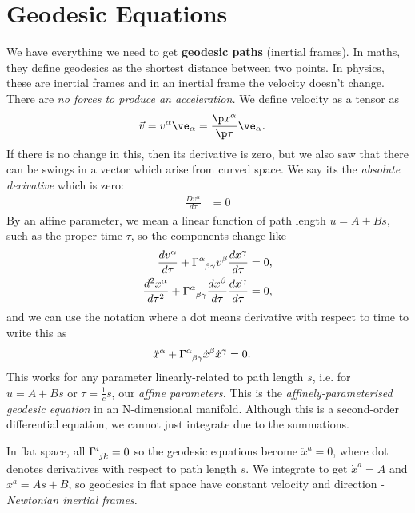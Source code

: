 \documentclass[a4paper, 11pt, normalem]{report}
\begin{document}
\section{Geodesic Equations}
We have everything we need to get \textbf{geodesic paths} (inertial frames).
In maths, they define geodesics as the shortest distance between two points. 
In physics, these are inertial frames and in an inertial frame the velocity doesn't change. 
There are \emph{no forces to produce an acceleration.}
We define velocity as a tensor as
\begin{align}
    \vec{v} &= v^\alpha\ve_{\alpha} = \frac{\p x^\alpha}{\p\tau}\ve_\alpha.
\end{align}
If there is no change in this, then its derivative is zero, but we also saw that there can be swings in a vector which arise from curved space. 
We say its the \emph{absolute derivative} which is zero:
\begin{align}
    \frac{Dv^\alpha}{d\tau} &= 0
\end{align}
By an affine parameter, we mean a linear function of path length $u=A+Bs$, such as the proper time $\tau$, so the components change like
\begin{align}
    \frac{dv^\alpha}{d\tau} + \tensor{\Gamma}{^\alpha_{\beta\gamma}}v^\beta\frac{dx^\gamma}{d\tau} &= 0, \\
    \frac{d^2x^\alpha}{d\tau^2} + \tensor{\Gamma}{^\alpha_{\beta\gamma}}\frac{dx^\beta}{d\tau}\frac{dx^\gamma}{d\tau} &= 0,
\end{align}
and we can use the notation where a dot means derivative with respect to time to write this as
\begin{align}
    \ddot{x}^\alpha + \tensor{\Gamma}{^\alpha_{\beta\gamma}}\dot{x}^\beta\dot{x}^\gamma &= 0.
\end{align}
This works for any parameter linearly-related to path length $s$, i.e. for $u=A+Bs$ or $\tau=\frac{1}{c}s$, our \emph{affine parameters.}
This is the \emph{affinely-parameterised geodesic equation} in an N-dimensional manifold.
Although this is a second-order differential equation, we cannot just integrate due to the summations.
\begin{example}
In flat space, all $\tensor{\Gamma}{^i_{jk}}=0$ so the geodesic equations become $\ddot{x}^a = 0$, where dot denotes derivatives with respect to path length $s$.
We integrate to get $\dot{x}^a=A$ and $x^a=As+B$, so geodesics in flat space have constant velocity and direction - \emph{Newtonian inertial frames.}
\end{example}
\end{document}
